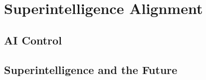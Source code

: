 \section{Superintelligence Alignment}
\cite{leike2023superalignment}
\cite{anthropic2025rsp}

\subsection{AI Control}
\cite{greenblatt2024aicontrol}

\cite{derner2024truesight,needham2025know}

\cite{baker2025monitoring}

\subsection{Superintelligence and the Future}
\cite{aschenbrenner2024situational}
\cite{bostrom2024utopia}
\cite{altman2024intelligence}
\cite{amodei2024grace}

